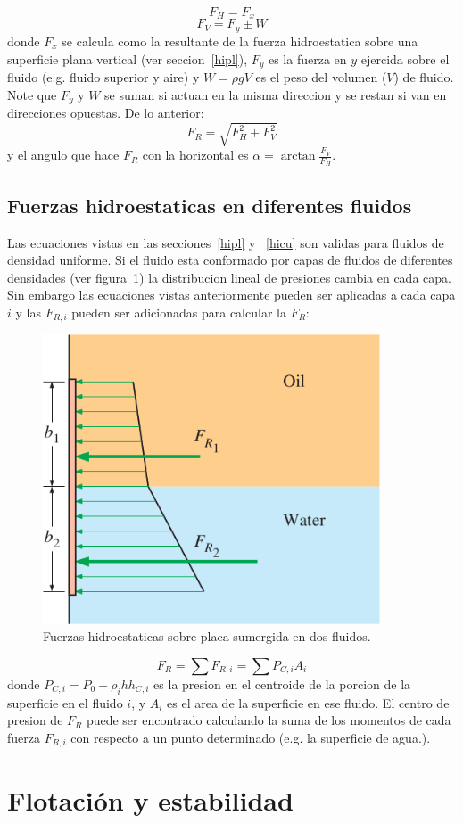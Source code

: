 \documentclass[10pt, oneside]{article}
\begin{document}
$$
F_H=F_x
$$
$$
F_V = F_y \pm W
$$
donde $F_x$ se calcula como la resultante de la fuerza hidroestatica sobre una superficie plana vertical (ver seccion~\ref{hipl}), $F_y$ es la fuerza en $y$ ejercida sobre el fluido (e.g. fluido superior y aire) y $W = \rho g V$ es el peso del volumen ($V$) de fluido. Note que $F_y$ y $W$ se suman si actuan en la misma direccion y se restan si van en direcciones opuestas. De lo anterior:
$$
F_R=\sqrt{F^2_H + F^2_V}
$$
y el angulo que hace $F_R$ con la horizontal es $\alpha = \arctan \frac{F_V}{F_H}$.


\subsection{Fuerzas hidroestaticas en diferentes fluidos}
Las ecuaciones vistas en las secciones~\ref{hipl} y ~\ref{hicu} son validas para fluidos de densidad uniforme. Si el fluido esta conformado por capas de fluidos de diferentes densidades (ver figura~\ref{mden}) la distribucion lineal de presiones cambia en cada capa. Sin embargo las ecuaciones vistas anteriormente pueden ser aplicadas a cada capa $i$ y las $F_{R,i}$ pueden ser adicionadas para calcular la $F_R$:
\begin{figure}[h]
\centering
\includegraphics[width=10cm]{mden}
\caption{Fuerzas hidroestaticas sobre placa sumergida en dos fluidos.}
\label{mden}
\end{figure}


$$
F_R = \sum F_{R,i} = \sum P_{C,i}A_i
$$
donde $P_{C,i} =  P_0 + \rho_i h h_{C,i}$ es la presion en el centroide de la porcion de la superficie en el fluido $i$, y $A_i$ es el area de la superficie en ese fluido. El centro de presion de $F_R$ puede ser encontrado calculando la suma de los momentos de cada fuerza $F_{R,i}$ con respecto a un punto determinado (e.g. la superficie de agua.).

\section{Flotaci\'on y estabilidad}
\end{document}
